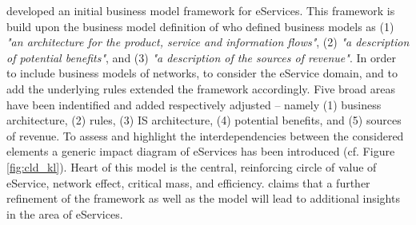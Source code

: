 \citet{Klueber2000} developed an initial business model framework for eServices. This framework is build upon the business model definition of \citet[p. 4]{Timmers1998} who defined business models as (1) \textit{"an architecture for the product, service and information flows"}, (2) \textit{"a description of potential benefits"}, and (3) \textit{"a description of the sources of revenue"}. In order to include business models of networks, to consider the eService domain, and to add the underlying rules \citet{Klueber2000} extended the framework accordingly. Five broad areas have been indentified and added respectively adjusted -- namely (1) business architecture, (2) rules, (3) \ac{IS} architecture, (4) potential benefits, and (5) sources of revenue. To assess and highlight the interdependencies between the considered elements a generic impact diagram of eServices has been introduced (cf. Figure \ref{fig:cld_kl}). Heart of this model is the central, reinforcing circle of value of eService, network effect, critical mass, and efficiency. \citet{Klueber2000} claims that a further refinement of the framework as well as the model will lead to additional insights in the area of eServices. 

